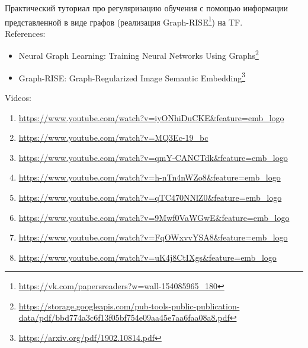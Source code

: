 Практический туториал про регуляризацию обучения с помощью информации представленной в виде графов (реализация Graph-RISE\footnote{\url{https://vk.com/papersreaders?w=wall-154085965_180}}) на TF. \\

References:

\begin{itemize}
    \item Neural Graph Learning: Training Neural Networks Using Graphs\footnote{\url{https://storage.googleapis.com/pub-tools-public-publication-data/pdf/bbd774a3c6f13f05bf754e09aa45e7aa6faa08a8.pdf}}
	\item Graph-RISE: Graph-Regularized Image Semantic Embedding\footnote{\url{https://arxiv.org/pdf/1902.10814.pdf}}
\end{itemize}

Videos:

\begin{enumerate}
    \item \url{https://www.youtube.com/watch?v=iyONhiDuCKE&feature=emb_logo}
    \item \url{https://www.youtube.com/watch?v=MQ3Ec-19_bc}
    \item \url{https://www.youtube.com/watch?v=qmY-CANCTdk&feature=emb_logo}
    \item \url{https://www.youtube.com/watch?v=h-nTn4nWZo8&feature=emb_logo}
    \item \url{https://www.youtube.com/watch?v=qTC470NNlZ0&feature=emb_logo}
    \item \url{https://www.youtube.com/watch?v=9Mwf0VaWGwE&feature=emb_logo}
    \item \url{https://www.youtube.com/watch?v=FqOWxvvYSA8&feature=emb_logo}
    \item \url{https://www.youtube.com/watch?v=uK4j8CtIXgs&feature=emb_logo}
\end{enumerate}




